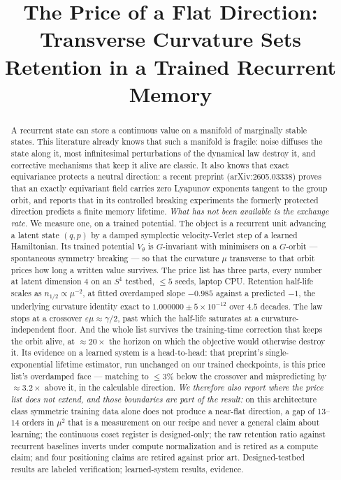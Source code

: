 \documentclass{article}
\title{The Price of a Flat Direction:\\ Transverse Curvature Sets Retention in a Trained Recurrent Memory}
\author{}
\begin{document}
\maketitle


\begin{abstract}
A recurrent state can store a continuous value on a manifold of marginally stable states. This literature already knows that such a manifold is fragile: noise diffuses the state along it, most infinitesimal perturbations of the dynamical law destroy it, and corrective mechanisms that keep it alive are classic. It also knows that exact equivariance protects a neutral direction: a recent preprint (arXiv:2605.03338) proves that an exactly equivariant field carries zero Lyapunov exponents tangent to the group orbit, and reports that in its controlled breaking experiments the formerly protected direction predicts a finite memory lifetime. \emph{What has not been available is the exchange rate.} We measure one, on a trained potential. The object is a recurrent unit advancing a latent state $(q,p)$ by a damped symplectic velocity-Verlet step of a learned Hamiltonian. Its trained potential $V_\theta$ is $G$-invariant with minimisers on a $G$-orbit --- spontaneous symmetry breaking --- so that the curvature $\mu$ transverse to that orbit prices how long a written value survives. The price list has three parts, every number at latent dimension $4$ on an $S^1$ testbed, $\le5$ seeds, laptop CPU. Retention half-life scales as $n_{1/2}\propto\mu^{-2}$, at fitted overdamped slope $-0.985$ against a predicted $-1$, the underlying curvature identity exact to $1.000000\pm5\!\times\!10^{-12}$ over $4.5$ decades. The law stops at a crossover $\varepsilon\mu\approx\gamma/2$, past which the half-life saturates at a curvature-independent floor. And the whole list survives the training-time correction that keeps the orbit alive, at $\approx20\times$ the horizon on which the objective would otherwise destroy it. Its evidence on a learned system is a head-to-head: that preprint's single-exponential lifetime estimator, run unchanged on our trained checkpoints, is this price list's overdamped face --- matching to $\le3\%$ below the crossover and mispredicting by $\approx3.2\times$ above it, in the calculable direction. \emph{We therefore also report where the price list does not extend, and those boundaries are part of the result:} on this architecture class symmetric training data alone does not produce a near-flat direction, a gap of $13$--$14$ orders in $\mu^2$ that is a measurement on our recipe and never a general claim about learning; the continuous coset register is designed-only; the raw retention ratio against recurrent baselines inverts under compute normalization and is retired as a compute claim; and four positioning claims are retired against prior art. Designed-testbed results are labeled verification; learned-system results, evidence.
\end{abstract}
\end{document}
